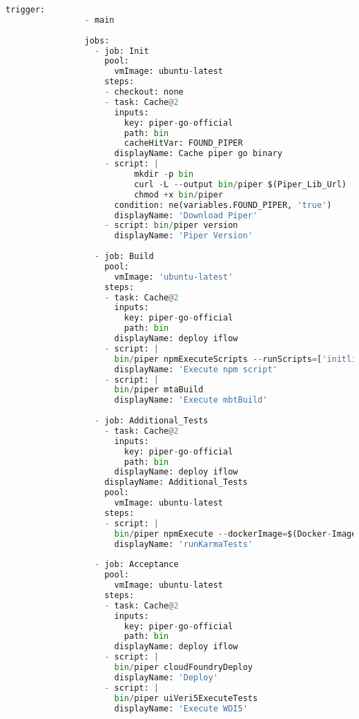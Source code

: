         \begin{lstlisting}[language=Python, breaklines=true, basicstyle=\small\ttfamily, frame=single]
                trigger:
                - main
                
                jobs:
                  - job: Init
                    pool:
                      vmImage: ubuntu-latest
                    steps:
                    - checkout: none
                    - task: Cache@2
                      inputs:
                        key: piper-go-official
                        path: bin
                        cacheHitVar: FOUND_PIPER
                      displayName: Cache piper go binary
                    - script: |
                          mkdir -p bin
                          curl -L --output bin/piper $(Piper_Lib_Url)
                          chmod +x bin/piper
                      condition: ne(variables.FOUND_PIPER, 'true')
                      displayName: 'Download Piper'
                    - script: bin/piper version
                      displayName: 'Piper Version'
                
                  - job: Build
                    pool:
                      vmImage: 'ubuntu-latest'
                    steps:
                    - task: Cache@2
                      inputs:
                        key: piper-go-official
                        path: bin 
                      displayName: deploy iflow
                    - script: |
                      bin/piper npmExecuteScripts --runScripts=['initlint']
                      displayName: 'Execute npm script'
                    - script: |
                      bin/piper mtaBuild 
                      displayName: 'Execute mbtBuild'
                
                  - job: Additional_Tests
                    - task: Cache@2
                      inputs:
                        key: piper-go-official
                        path: bin 
                      displayName: deploy iflow
                    displayName: Additional_Tests
                    pool:
                      vmImage: ubuntu-latest
                    steps: 
                    - script: |
                      bin/piper npmExecute --dockerImage=$(Docker-Image-Endpoint) --npmRunCommand='run mykarma:ci'
                      displayName: 'runKarmaTests'
                
                  - job: Acceptance
                    pool:
                      vmImage: ubuntu-latest
                    steps:
                    - task: Cache@2
                      inputs:
                        key: piper-go-official
                        path: bin 
                      displayName: deploy iflow
                    - script: |
                      bin/piper cloudFoundryDeploy 
                      displayName: 'Deploy'
                    - script: |
                      bin/piper uiVeri5ExecuteTests 
                      displayName: 'Execute WDI5'	  
                              

\end{lstlisting}
